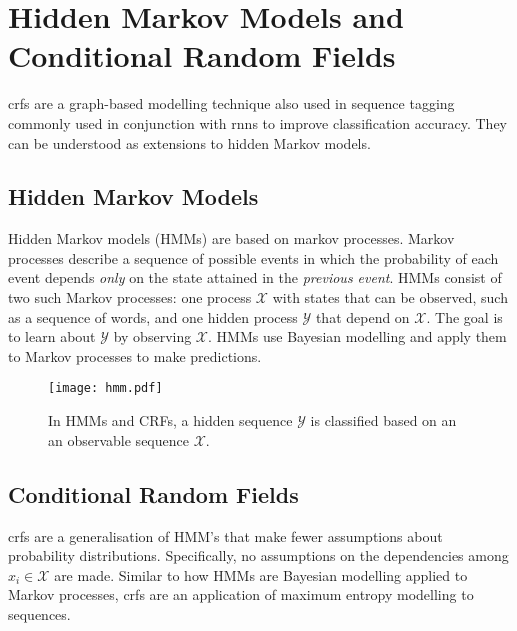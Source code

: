 \section[Conditional Random Fields]{Hidden Markov Models and Conditional Random Fields}

\Glspl{crf} are a graph-based modelling technique also used in sequence tagging commonly used in conjunction with \glspl{rnn} to improve classification accuracy. They can be understood as extensions to hidden Markov models.

\subsection{Hidden Markov Models}

    Hidden Markov models (HMMs) are based on markov processes. Markov processes describe a sequence of possible events in which the probability of each event depends \textit{only} on the state attained in the \textit{previous event}\cite{gagniuc2017markov}.
    HMMs consist of two such Markov processes: one process $\mathcal{X}$ with states that can be observed, such as a sequence of words, and one hidden process $\mathcal{Y}$ that depend on $\mathcal{X}$. The goal is to learn about $\mathcal{Y}$ by observing $\mathcal{X}$. HMMs use Bayesian modelling and apply them to Markov processes to make predictions\cite{klinger2007classical}.
   
    \begin{figure}[t]
        \centering
        \texttt{[image: hmm.pdf]}
        \caption{In HMMs and CRFs, a hidden sequence $\mathcal{Y}$ is classified based on an an observable sequence $\mathcal{X}$.}
        \label{fig: HMM and CRF}
    \end{figure}

\subsection{Conditional Random Fields}
    \Glspl{crf} are a generalisation of HMM's that make fewer assumptions about probability distributions. Specifically, no assumptions on the dependencies among $x_{i} \in \mathcal{X}$ are made\cite{klinger2007classical}. Similar to how HMMs are Bayesian modelling applied to Markov processes, \glspl{crf} are an application of maximum entropy modelling to sequences\cite{klinger2007classical}.